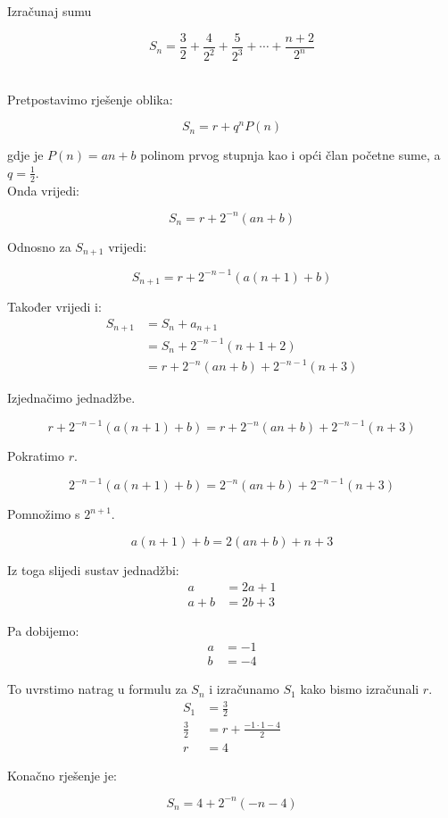 \documentclass[exam.tex]{subfiles}
\begin{document}
	\begin{task}
		Izračunaj sumu
	
		\[ S_n = \frac{3}{2} + \frac{4}{2^2} + \frac{5}{2^3} + \cdots + \frac{n+2}{2^n} \]\\[1em]
	\end{task} 
	
	Pretpostavimo rješenje oblika:
	
	\[ S_n = r + q^n P(n) \]
	
	gdje je \( P(n) = an + b \) polinom prvog stupnja kao i opći član početne sume, a \( q = \frac{1}{2} \). \\
	
	Onda vrijedi:
	
	\[ S_n = r + 2^{-n} (an + b) \]
	
	Odnosno za \( S_{n+1} \) vrijedi:
	
	\[ S_{n + 1} = r + 2^{-n-1} (a(n + 1) + b) \]
	
	Također vrijedi i:
	\begin{align*}
		S_{n + 1} &= S_n + a_{n + 1} \\
		&= S_n + 2^{-n - 1} (n + 1 + 2)  \\
		&= r + 2^{-n} (an + b) + 2^{-n-1} (n + 3) 
	\end{align*}
	
	Izjednačimo jednadžbe.
	
	\[ r + 2^{-n-1} (a(n + 1) + b) = r + 2^{-n} (an + b) + 2^{-n-1} (n + 3) \] 
	
	Pokratimo \( r \).
	
	\[ 2^{-n-1} (a(n + 1) + b) = 2^{-n} (an + b) + 2^{-n-1} (n + 3) \]
	
	Pomnožimo s \( 2^{n+1} \).
	
	\[ a(n + 1) + b = 2 (an + b) +  n + 3 \]
	
	Iz toga slijedi sustav jednadžbi:
	\begin{align*}
		a &= 2a + 1 \\
		a + b &= 2b + 3
	\end{align*}
	
	Pa dobijemo:
	\begin{align*}
		a &= -1 \\
		b &= -4
	\end{align*}
	
	To uvrstimo natrag u formulu za \( S_n \) i izračunamo \( S_1 \) kako bismo izračunali \( r \).
	\begin{align*}
		S_1 &= \frac{3}{2} \\ 
		\frac{3}{2} &= r + \frac{-1 \cdot 1 - 4}{2} \\
		r &= 4
	\end{align*}
	
	Konačno rješenje je:
	
	\[ S_n = 4 + 2^{-n} (-n -4) \]
\end{document}
